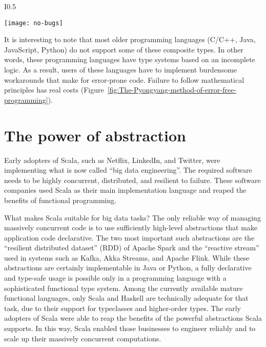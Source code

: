 \begin{wrapfigure}{I}{0.5\columnwidth}%
\begin{centering}
\vspace{-0.5\baselineskip}
\texttt{[image: no-bugs]}\vspace{-0.5\baselineskip}
\par\end{centering}
\caption{The Pyongyang method of error-free software engineering.\label{fig:The-Pyongyang-method-of-error-free-programming}}
\vspace{-3\baselineskip}
\end{wrapfigure}%

It is interesting to note that most older programming languages (C/C++,
Java, JavaScript, Python) do not support some of these composite types.
In other words, these programming languages have type systems based
on an incomplete logic. As a result, users of these languages have
to implement burdensome workarounds that make for error-prone code.
Failure to follow mathematical principles has real costs (Figure~\ref{fig:The-Pyongyang-method-of-error-free-programming}).

\section{The power of abstraction}

Early adopters of Scala, such as Netflix, LinkedIn, and Twitter, were
implementing what is now called ``big data engineering''. The required
software needs to be highly concurrent, distributed, and resilient
to failure. These software companies used Scala as their main implementation
language and reaped the benefits of functional programming.

What makes Scala suitable for big data tasks? The only reliable way
of managing massively concurrent code is to use sufficiently high-level
abstractions that make application code declarative. The two most
important such abstractions are the ``resilient distributed dataset''
(RDD) of Apache Spark and the ``reactive stream'' used in systems
such as Kafka, Akka Streams, and Apache Flink. While these abstractions
are certainly implementable in Java or Python, a fully declarative
and type-safe usage is possible only in a programming language with
a sophisticated functional type system. Among the currently available
mature functional languages, only Scala and Haskell are technically
adequate for that task, due to their support for typeclasses and higher-order
types. The early adopters of Scala were able to reap the benefits
of the powerful abstractions Scala supports. In this way, Scala enabled
those businesses to engineer reliably and to scale up their massively
concurrent computations.

